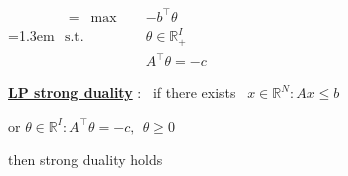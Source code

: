 \documentclass[10pt]{article}
\newenvironment{board}{%
  \par\vspace{4pt}
  \begingroup\leftskip=1.3em\relax\parskip=2pt\relax}{%
  \par\endgroup\vspace{4pt}}
\begin{document}
\begin{board}
$\begin{aligned}
  =\ \max\quad & {-b^{\top}\theta} \\
  \text{s.t.}\quad & \theta \in \mathbb{R}^I_+ \\
                   & A^{\top}\theta = -c
\end{aligned}$
\vspace{16pt}

\underline{\textbf{LP strong duality}} : \ if there exists \ $x \in \mathbb{R}^N : Ax \le b$
\vspace{4pt}

\hspace{4.0cm} or \quad $\theta \in \mathbb{R}^I : A^{\top}\theta = -c, \ \ \theta \ge 0$
\vspace{6pt}

\hspace{2.7cm} then strong duality holds
\end{board}
\end{document}
